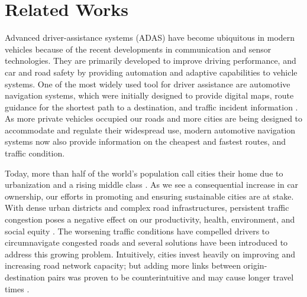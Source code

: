 
\chapter{Related Works}
\label{ChapterRL}

Advanced driver-assistance systems (ADAS) have become ubiquitous in modern vehicles because of the recent developments in communication and sensor technologies. They are primarily developed to improve driving performance, and car and road safety by providing automation and adaptive capabilities to vehicle systems. One of the most widely used tool for driver assistance are automotive navigation systems, which were initially designed to provide digital maps, route guidance for the shortest path to a destination, and traffic incident information \cite{Mikami1978CACS-UrbanControl}. As more private vehicles occupied our roads and more cities are being designed to accommodate and regulate their widespread use, modern automotive navigation systems now also provide information on the cheapest and fastest routes, and traffic condition.

Today, more than half of the world's population call cities their home due to urbanization and a rising middle class \cite{UnitedNations2017}. As we see a consequential increase in car ownership, our efforts in promoting and ensuring sustainable cities are at stake. With dense urban districts and complex road infrastructures, persistent traffic congestion poses a negative effect on our productivity, health, environment, and social equity \cite{Mehndiratta2017}. The worsening traffic conditions have compelled drivers to circumnavigate congested roads and several solutions have been introduced to address this growing problem. Intuitively, cities invest heavily on improving and increasing road network capacity; but adding more links between origin-destination pairs was proven to be counterintuitive and may cause longer travel times \cite{Braess2005,Afimeimounga2005}. 


